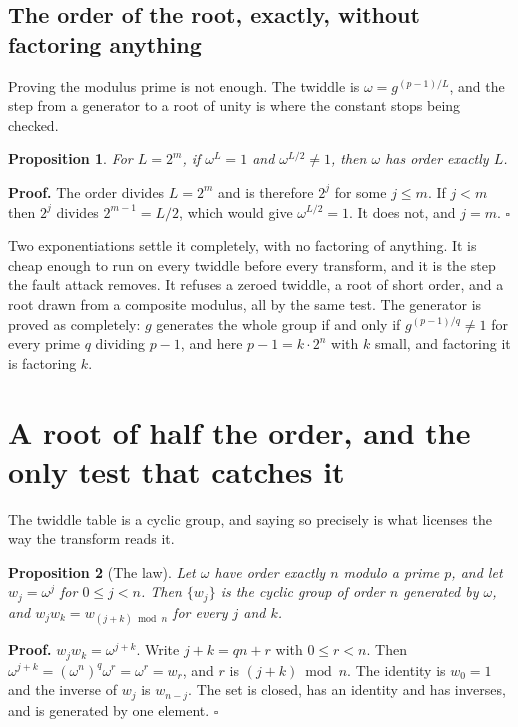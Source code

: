\documentclass{article}
\newtheorem{proposition}{Proposition}
\begin{document}
\subsection{The order of the root, exactly, without factoring anything}

Proving the modulus prime is not enough. The twiddle is \(\omega = g^{(p-1)/L}\), and the step from a generator to a root of unity is where the constant stops being checked.

\begin{proposition}
For \(L = 2^m\), if \(\omega^L = 1\) and \(\omega^{L/2} \ne 1\), then \(\omega\) has order exactly \(L\).
\end{proposition}

\textbf{Proof.} The order divides \(L = 2^m\) and is therefore \(2^j\) for some \(j \le m\). If \(j < m\) then \(2^j\) divides \(2^{m-1} = L/2\), which would give \(\omega^{L/2} = 1\). It does not, and \(j = m\). \(\square\)

Two exponentiations settle it completely, with no factoring of anything. It is cheap enough to run on every twiddle before every transform, and it is the step the fault attack removes. It refuses a zeroed twiddle, a root of short order, and a root drawn from a composite modulus, all by the same test. The generator is proved as completely: \(g\) generates the whole group if and only if \(g^{(p-1)/q} \ne 1\) for every prime \(q\) dividing \(p-1\), and here \(p - 1 = k \cdot 2^n\) with \(k\) small, and factoring it is factoring \(k\).

\section{A root of half the order, and the only test that catches it}

The twiddle table is a cyclic group, and saying so precisely is what licenses the way the transform reads it.

\begin{proposition}[The law]
Let \(\omega\) have order exactly \(n\) modulo a prime \(p\), and let \(w_j = \omega^j\) for \(0 \le j < n\). Then \(\{w_j\}\) is the cyclic group of order \(n\) generated by \(\omega\), and \(w_j w_k = w_{(j+k) \bmod n}\) for every \(j\) and \(k\).
\end{proposition}

\textbf{Proof.} \(w_j w_k = \omega^{j+k}\). Write \(j + k = qn + r\) with \(0 \le r < n\). Then \(\omega^{j+k} = (\omega^n)^q \omega^r = \omega^r = w_r\), and \(r\) is \((j+k) \bmod n\). The identity is \(w_0 = 1\) and the inverse of \(w_j\) is \(w_{n-j}\). The set is closed, has an identity and has inverses, and is generated by one element. \(\square\)
\end{document}

